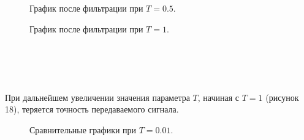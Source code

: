 \documentclass[a5paper, 10pt]{article}
\theoremstyle{definition}
\theoremstyle{plain}
\theoremstyle{remark}
\begin{document}
\begin{figure}[h!]
\caption{График после фильтрации при $T = 0.5$.}
\caption{График после фильтрации при $T = 1$.}
\end{figure}
\,\\
\\
\\
\\
При дальнейшем увеличении значения параметра $T$, начиная с $T= 1$ (рисунок 18), теряется точность передаваемого сигнала.

\begin{figure}[h!]
\caption{Сравнительные графики при $T = 0.01$.}
\end{figure}
\end{document}
